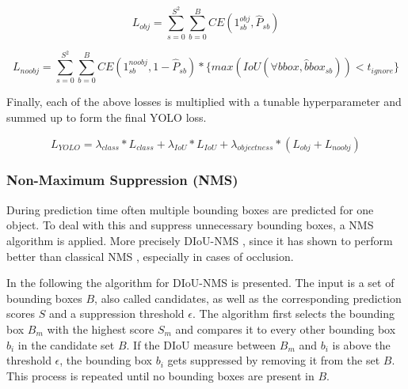 \begin{equation}
    L_{obj} = \sum_{s=0}^{S^2}\sum_{b=0}^{B} CE(1^{obj}_{sb}, \hat{P}_{sb})
    \label{eq:yolo_lobj}
\end{equation}

\begin{equation}
    L_{noobj} = \sum_{s=0}^{S^2}\sum_{b=0}^{B} CE(1^{noobj}_{sb}, 1 - \hat{P}_{sb}) * \{max(IoU(\forall bbox, \hat{b}box_{sb})) < t_{ignore}\}
    \label{eq:yolo_lnoobj}
\end{equation}


Finally, each of the above losses is multiplied with a tunable hyperparameter and summed up to form the final \ac{YOLO} loss.

\begin{equation}
    L_{YOLO} = \lambda_{class} * L_{class} + \lambda_{IoU} * L_{IoU} + \lambda_{objectness} * (L_{obj} + L_{noobj})
    \label{eq:yolo_loss}
\end{equation}

\subsubsection{Non-Maximum Suppression (NMS)}

During prediction time often multiple bounding boxes are predicted for one object.
To deal with this and suppress unnecessary bounding boxes, a \ac{NMS} algorithm is applied.
More precisely \ac{DIoU}-\ac{NMS} \cite{diou}, since it has shown to perform better than classical \ac{NMS} \cite{soft_nms}, especially in cases of occlusion.

In the following the algorithm for \ac{DIoU}-\ac{NMS} is presented.
The input is a set of bounding boxes $B$, also called candidates, as well as the corresponding prediction scores $S$ and a suppression threshold $\epsilon$.
The algorithm first selects the bounding box $B_m$ with the highest score $S_m$ and compares it to every other bounding box $b_i$ in the candidate set $B$.
If the \ac{DIoU} measure between $B_m$ and $b_i$ is above the threshold $\epsilon$, the bounding box $b_i$ gets suppressed by removing it from the set $B$.
This process is repeated until no bounding boxes are present in $B$.

